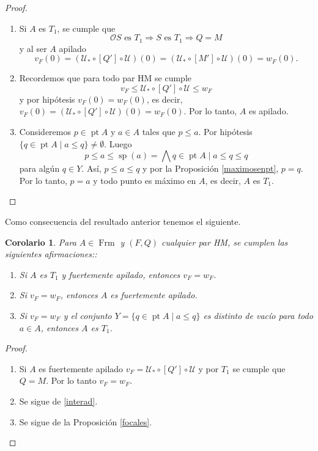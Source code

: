 \documentclass[12pt]{article}
\newtheorem{cor}[thm]{Corolario}
\DeclareMathOperator{\Frm}{Frm}
\DeclareMathOperator{\Sp}{sp}
\DeclareMathOperator{\pt}{pt}
\begin{document}
\begin{proof}
	\mbox{}

	\begin{enumerate}
		\item Si $A$ es $T_1$, se cumple que
		\[
		\mathcal{O}S\text{ es }T_1\Rightarrow S\text{ es }T_1\Rightarrow Q=M
		\]
		y al ser $A$ apilado
		\[
		v_F(0)=(\mathcal{U}_*\circ [Q']\circ \mathcal{U})(0)=(\mathcal{U}_*\circ[M']\circ \mathcal{U})(0)=w_F(0).
		\]
		\item Recordemos que para todo par HM se cumple 
		\begin{equation}\label{interad}
		v_F\leq \mathcal{U}_*\circ [Q']\circ \mathcal{U}\leq w_F
		\end{equation}
		y por hipótesis $v_F(0)=w_F(0)$, es decir, $v_F(0)=(\mathcal{U}_*\circ [Q']\circ \mathcal{U})(0)=w_F(0)$. Por lo tanto, $A$ es apilado.
		\item Consideremos $p\in \pt A$ y $a\in A$ tales que $p\leq a$. Por hipótesis $\{q\in \pt A\mid a\leq q\}\neq \emptyset$. Luego 
		\[
		p\leq a\leq \Sp (a)=\bigwedge{q\in \pt A\mid a\leq q}\leq q
		\]
		para algún $q\in Y$. Así, $p\leq a\leq q$ y por la Proposición \ref{maximosenpt}, $p=q$. Por lo tanto, $p=a$ y todo punto es máximo en $A$, 
		es decir, $A$ es $T_1$.
	\end{enumerate}
\end{proof}

Como consecuencia del resultado anterior tenemos el siguiente.

\begin{cor}\label{vF=wF}
Para $A\in \Frm$ y $(F, Q)$ cualquier par HM, se cumplen las siguientes afirmaciones::
\begin{enumerate}
\item Si $A$ es $T_1$ y fuertemente apilado, entonces $v_F=w_F$.
\item Si $v_F=w_F$, entonces $A$ es fuertemente apilado.
\item Si $v_F=w_F$ y el conjunto $Y=\{q\in \pt A\mid a\leq q\}$ es distinto de vacío para todo $a\in A$, entonces $A$ es $T_1$.
\end{enumerate}
\end{cor}

\begin{proof}
	\mbox{}

	\begin{enumerate}
	\item Si $A$ es fuertemente apilado $v_F=\mathcal{U}_*\circ [Q']\circ \mathcal{U}$ y por $T_1$ se cumple que $Q=M$. Por lo tanto $v_F=w_F$.
	\item Se sigue de \eqref{interad}.
	\item Se sigue de la Proposición \ref{focales}.
	\end{enumerate}
\end{proof}
\end{document}
